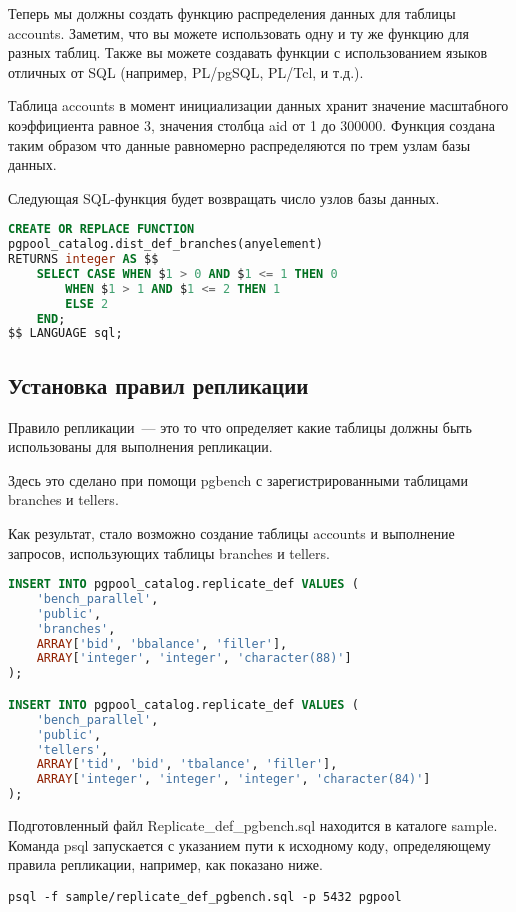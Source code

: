 Теперь мы должны создать функцию распределения данных для таблицы accounts. Заметим, что вы можете использовать 
одну и ту же функцию для разных таблиц. Также вы можете создавать функции с использованием языков отличных от SQL 
(например, PL/pgSQL, PL/Tcl, и т.д.).

Таблица accounts в момент инициализации данных хранит значение масштабного коэффициента равное 3, значения 
столбца aid от 1 до 300000. Функция создана таким образом что данные равномерно распределяются по трем узлам базы данных.

Следующая SQL-функция будет возвращать число узлов базы данных.
\begin{lstlisting}[language=SQL,label=lst:pgpool34,caption=Установка правил распределения данных]
CREATE OR REPLACE FUNCTION 
pgpool_catalog.dist_def_branches(anyelement)
RETURNS integer AS $$
    SELECT CASE WHEN $1 > 0 AND $1 <= 1 THEN 0
        WHEN $1 > 1 AND $1 <= 2 THEN 1
        ELSE 2
    END;
$$ LANGUAGE sql;
\end{lstlisting}

\subsection{Установка правил репликации}
Правило репликации~--- это то что определяет какие таблицы должны быть использованы для выполнения репликации.

Здесь это сделано при помощи pgbench с зарегистрированными таблицами branches и tellers.

Как результат, стало возможно создание таблицы accounts и выполнение запросов, использующих таблицы branches и tellers.
\begin{lstlisting}[language=SQL,label=lst:pgpool35,caption=Установка правил репликации]
INSERT INTO pgpool_catalog.replicate_def VALUES (
    'bench_parallel',
    'public',
    'branches',
    ARRAY['bid', 'bbalance', 'filler'],
    ARRAY['integer', 'integer', 'character(88)']
);

INSERT INTO pgpool_catalog.replicate_def VALUES (
    'bench_parallel',
    'public',
    'tellers',
    ARRAY['tid', 'bid', 'tbalance', 'filler'],
    ARRAY['integer', 'integer', 'integer', 'character(84)']
);
\end{lstlisting}

Подготовленный файл Replicate\_def\_pgbench.sql находится в каталоге sample. Команда psql запускается с указанием пути к 
исходному коду, определяющему правила репликации, например, как показано ниже.
\begin{lstlisting}[label=lst:pgpool36,caption=Установка правил репликации]
psql -f sample/replicate_def_pgbench.sql -p 5432 pgpool
\end{lstlisting}

